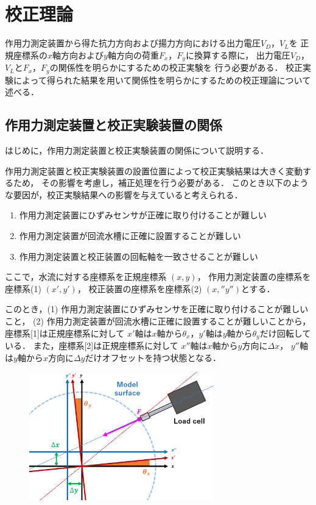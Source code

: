 \section{校正理論}
作用力測定装置から得た抗力方向および揚力方向における出力電圧$V_D$，$V_L$を
正規座標系の$x$軸方向および$y$軸方向の荷重$F_x$，$F_y$に換算する際に，
出力電圧$V_D$，$V_L$と$F_x$，$F_y$の関係性を明らかにするための校正実験を
行う必要がある．
校正実験によって得られた結果を用いて関係性を明らかにするための校正理論について述べる．

\subsection{作用力測定装置と校正実験装置の関係}
はじめに，作用力測定装置と校正実験装置の関係について説明する．

作用力測定装置と校正実験装置の設置位置によって校正実験結果は大きく変動するため，
その影響を考慮し，補正処理を行う必要がある．
このとき以下のような要因が，校正実験結果への影響を与えていると考えられる．

\begin{enumerate}[(1)]
    \item 作用力測定装置にひずみセンサが正確に取り付けることが難しい
    \item 作用力測定装置が回流水槽に正確に設置することが難しい
    \item 作用力測定装置と校正装置の回転軸を一致させることが難しい
\end{enumerate}

ここで，水流に対する座標系を正規座標系 $(x,y)$，
作用力測定装置の座標系を座標系(1) $(x',y')$，
校正装置の座標系を座標系(2) $(x,'' y'')$とする．

このとき，(1) 作用力測定装置にひずみセンサを正確に取り付けることが難しいこと，
(2) 作用力測定装置が回流水槽に正確に設置することが難しいことから，
座標系[1]は正規座標系に対して
$x'$軸は$x$軸から$\theta_x$，$y'$軸は$y$軸から$\theta_y$だけ回転している．
また，座標系[2]は正規座標系に対して
$x''$軸は$x$軸から$y$方向に$\Delta x$，
$y''$軸は$y$軸から$x$方向に$\Delta y$だけオフセットを持つ状態となる．

\begin{figure}[htbp]
    \footnotesize
    \begin{center}
        \includegraphics[width=80mm]{images/31-1.png}
        \caption{}
    \end{center}
\end{figure}

